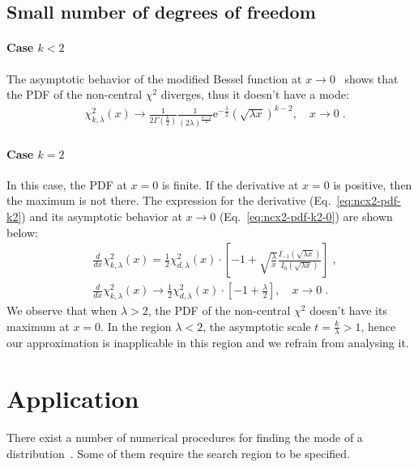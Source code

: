 \documentclass[final,5p,twocolumn,times,authoryear]{elsarticle}
\begin{document}
\subsection{Small number of degrees of freedom}\label{subsec:edge-cases}
%
\paragraph{Case $k < 2$}
The asymptotic behavior of the modified Bessel function at $x \rightarrow 0$~\cite[Eq.~10.30.1]{NIST:DLMF} shows that the PDF of the non-central $\chi^2$ diverges, thus it doesn't have a mode:
%
\begin{align}
 &\chi^2_{k, \lambda}(x) \rightarrow \frac{1}{2\Gamma(\frac{k}{2})} \frac{1}{(2 \lambda)^{\frac{k - 2}{2}}} \mathrm{e}^{-\frac{\lambda}{2}} \left(\sqrt{\lambda x}\right)^{k-2}, \quad x \rightarrow 0\;.
\end{align}
%
\paragraph{Case $k = 2$}
In this case, the PDF at $x=0$ is finite. If the derivative at $x=0$ is positive, then the maximum is not there. The expression for the derivative (Eq.~\ref{eq:ncx2-pdf-k2}) and its asymptotic behavior at $x \rightarrow 0$ (Eq.~\ref{eq:ncx2-pdf-k2-0}) are shown below:
%
\begin{align}
 &\frac{d}{dx} \chi^2_{k, \lambda}(x) = \frac{1}{2} \chi^2_{d, \lambda}(x) \cdot \left[ -1 +  \sqrt{\frac{\lambda}{x}}\frac{I_{-1}(\sqrt{\lambda x})}{I_{0}(\sqrt{\lambda x})} \right]\label{eq:ncx2-pdf-k2}\;, \\
 &\frac{d}{dx} \chi^2_{k, \lambda}(x) \rightarrow \frac{1}{2} \chi^2_{d, \lambda}(x) \cdot \left[ -1 + \frac{\lambda}{2} \right], \quad x \rightarrow 0\label{eq:ncx2-pdf-k2-0}\;.
\end{align}
%
We observe that when $\lambda > 2$, the PDF of the non-central $\chi^2$ doesn't have its maximum at $x = 0$. In the region $\lambda < 2$, the asymptotic scale $t = \frac{k}{\lambda} > 1$, hence our approximation is inapplicable in this region and we refrain from analysing it.

\section{Application}
There exist a number of numerical procedures for finding the mode of a distribution~\cite[Ch.~10]{NR}. Some of them require the search region to be specified.
\end{document}
